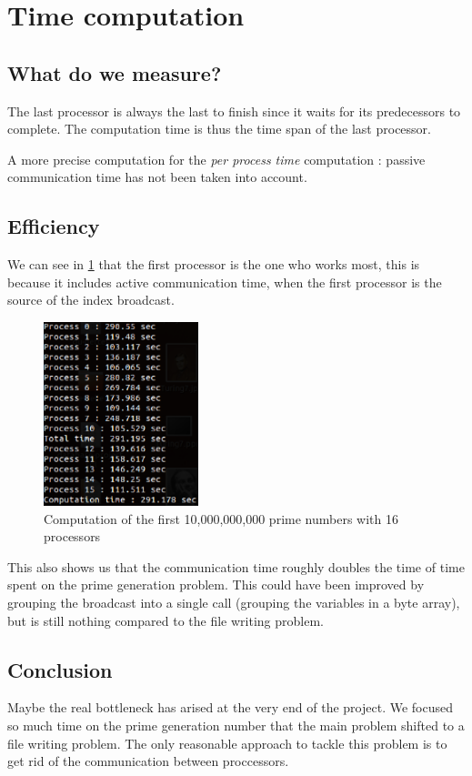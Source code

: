 \newpage\cleardoublepage{}
\section{Time computation}
\subsection{What do we measure?}
The last processor is always the last to finish since it waits for its predecessors to complete.
The computation time is thus the time span of the last processor.

A more precise computation for the \emph{per process time} computation : passive communication time has not been taken into account.

\subsection{Efficiency}

We can see in \ref{fig:time:1} that the first processor is the one who works most, this is because it includes active communication time, when the first processor is the source of the index broadcast. 

\begin{figure}
	\centering
	\includegraphics[width=0.4\textwidth]{eps/time}
	\caption{\label{fig:time:1} Computation of the first 10,000,000,000 prime numbers with 16 processors}
\end{figure}

This also shows us that the communication time roughly doubles the time of time spent on the prime generation problem. This could have been improved by grouping the broadcast into a single call (grouping the variables in a byte array), but is still nothing compared to the file writing problem.

\subsection{Conclusion}
Maybe the real bottleneck has arised at the very end of the project. We focused so much time on the prime generation number that the main problem shifted to a file writing problem. The only reasonable approach to tackle this problem is to get rid of the communication between proccessors.